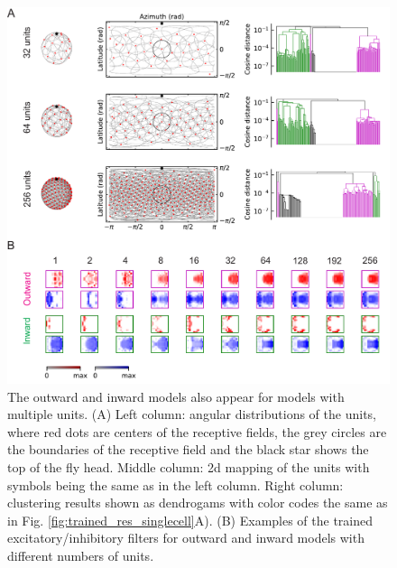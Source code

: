 \documentclass[pdftex,9pt,lineno]{elife}
\begin{document}
\begin{figure}
\includegraphics[width=\linewidth]{figures/trained_results_multicells_paper.pdf}
\caption{The outward and inward models also appear for models with multiple units. (A) Left column: angular distributions of the units, where red dots are centers of the receptive fields, the grey circles are the boundaries of the receptive field and the black star shows the top of the fly head. Middle column: 2d mapping of the units with symbols being the same as in the left column. Right column: clustering results shown as dendrogams with color codes the same as in Fig. \ref{fig:trained_res_singlecell}A). (B) Examples of the trained excitatory/inhibitory filters for outward and inward models with different numbers of units.}
\label{fig:trained_res_multicells}

\end{figure}
\end{document}
